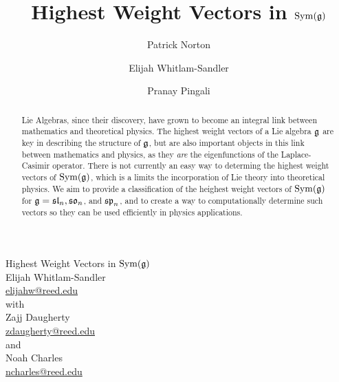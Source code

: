 \documentclass[11pt, reqno]{amsart}
\title{Highest Weight Vectors in $\operatorname{Sym}(\mathfrak{g})$}
\author{Patrick Norton \and Elijah Whitlam-Sandler \and Pranay Pingali}
\begin{document}
\thispagestyle{empty}
\setcounter{page}{0}
\vspace*{\fill}
\begin{center}
  Highest Weight Vectors in $\operatorname{Sym}(\mathfrak{g})$\\[10pt]
  Elijah Whitlam-Sandler\\
  \href{mailto:elijahw@reed.edu}{elijahw@reed.edu}\\[10pt]
  with\\[10pt]
  Zajj Daugherty\\
  \href{mailto:zdaugherty@reed.edu}{zdaugherty@reed.edu}\\[10pt]
  and\\[10pt]
  Noah Charles\\
  \href{mailto:ncharles@reed.edu}{ncharles@reed.edu}
\end{center}
\vspace*{\fill}
\newpage

\begin{abstract}
  Lie Algebras, since their discovery, have grown to become an integral link between mathematics and theoretical physics. The highest weight vectors of a Lie algebra $\mathfrak{g}$ are key in describing the structure of $\mathfrak{g}$, but are also important objects in this link between mathematics and physics, as they \emph{are} the eigenfunctions of the Laplace-Casimir operator. There is not currently an easy way to determing the highest weight vectors of $\operatorname{Sym}(\mathfrak{g})$, which is a limits the incorporation of Lie theory into theoretical physics. We aim to provide a classification of the heighest weight vectors of $\operatorname{Sym}(\mathfrak{g})$ for $\mathfrak{g}=\mathfrak{sl}_n,\mathfrak{so}_n$, and $\mathfrak{sp}_n$, and to create a way to computationally determine such vectors so they can be used efficiently in physics applications.
\end{abstract}



\maketitle
\end{document}
